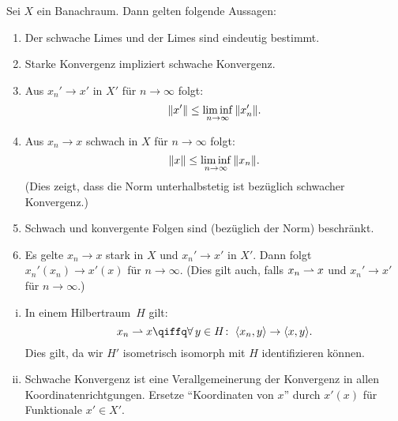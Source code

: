 \begin{thLemma}
    Sei $X$ ein Banachraum. Dann gelten folgende Aussagen:
    \begin{enumerate}[(1)]
        \item
            Der schwache Limes und der \schwachstern Limes sind eindeutig bestimmt.
        
        \item
            Starke Konvergenz impliziert schwache Konvergenz.
            
        \item
            Aus $x_n'\to x'$ \schwachstern in $X'$ für $n\to\infty$ folgt:
            \[ \lVert x'\rVert \leq \liminf_{n\to\infty} \, \lVert x_n'\rVert  . \]
            
        \item
            Aus $x_n\to x$ schwach in $X$ für $n\to\infty$ folgt:
            \[ \lVert x\rVert \leq \liminf_{n\to\infty} \, \lVert x_n\rVert  . \]
            (Dies zeigt, dass die Norm unterhalbstetig ist bezüglich schwacher
            Konvergenz.)
            
        \item
            Schwach und \schwachstern konvergente Folgen sind (bezüglich der Norm)
            beschränkt.
            
        \item
            Es gelte $x_n\to x$ stark in $X$ und $x_n'\to x'$ \schwachstern in $X'$.
            Dann folgt $x_n'(x_n) \to x'(x)$ für $n\to\infty$. (Dies gilt auch,
            falls $x_n\rightharpoonup x$ und $x_n'\to x'$ für $n\to\infty$.)
    \end{enumerate}
\end{thLemma}


\begin{thBemerkung}\hfill
    \begin{enumerate}[(i)]
        \item
            In einem Hilbertraum~$H$ gilt:
            \[ x_n\weakto x
                \qiffq \forall\,y\in H\colon\;
                \SP{x_n,y} \to \SP{x,y}
            . \] 
            Dies gilt, da wir $H'$ isometrisch isomorph mit $H$ identifizieren
            können.
            
        \item
            Schwache Konvergenz ist eine Verallgemeinerung der Konvergenz in
            allen Koordinatenrichtgungen. Ersetze \enquote{Koordinaten von $x$}
            durch $x'(x)$ für Funktionale $x'\in X'$.
    \end{enumerate}
\end{thBemerkung}
